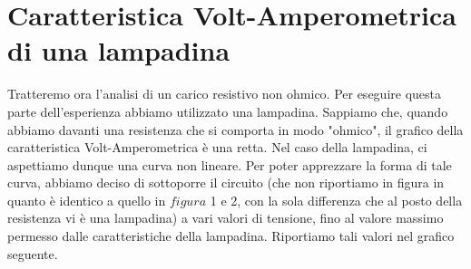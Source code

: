 \section{Caratteristica Volt-Amperometrica di una lampadina}
Tratteremo ora l'analisi di un carico resistivo non ohmico. Per eseguire questa parte dell'esperienza abbiamo utilizzato una lampadina. Sappiamo che, quando abbiamo davanti una resistenza che si comporta in modo "ohmico", il grafico della caratteristica Volt-Amperometrica è una retta. Nel caso della lampadina, ci aspettiamo dunque una curva non lineare. Per poter apprezzare la forma di tale curva, abbiamo deciso di sottoporre il circuito (che non riportiamo in figura in quanto è identico a quello in $figura$ 1 e 2, con la sola differenza che al posto della resistenza vi è una lampadina) a vari valori di tensione, fino al valore massimo permesso dalle caratteristiche della lampadina. Riportiamo tali valori nel grafico seguente. 
